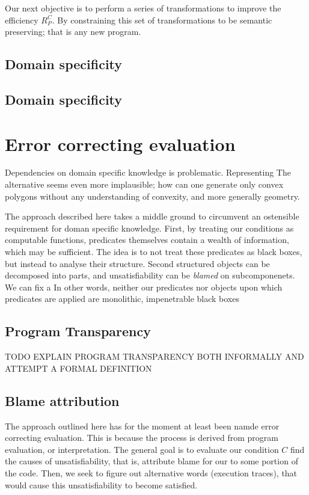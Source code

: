 Our next objective is to perform a series of transformations to improve the efficiency $R_P^C$.
By constraining this set of transformations to be semantic preserving; that is any new program.

\subsection{Domain specificity}

\subsection{Domain specificity}

\section{Error correcting evaluation}
Dependencies on domain specific knowledge is problematic.
Representing 
The alternative seems even more implausible; how can one generate only convex polygons without any understanding of  convexity, and more generally geometry.

The approach described here takes a middle ground to circumvent an ostensible requirement for doman specific knowledge.
First, by treating our conditions as computable functions, predicates themselves contain a wealth of information, which may be sufficient.
The idea is to not treat these predicates as black boxes, but instead to analyse their structure.
Second structured objects can be decomposed into parts, and unsatisfiability can be {\em blamed} on subcomponenets.
We can fix a 
In other words, neither our predicates nor objects upon which predicates are applied are monolithic, impenetrable black boxes

\subsection{Program Transparency}
TODO EXPLAIN PROGRAM TRANSPARENCY BOTH INFORMALLY AND ATTEMPT A FORMAL DEFINITION

\subsection{Blame attribution}
The approach outlined here has for the moment at least been namde error correcting evaluation.
This is because the process is derived from program evaluation, or interpretation.
The general goal is to evaluate our condition $C$ find the causes of unsatisfiability, that is, attribute blame for our to some portion of the code.
Then, we seek to figure out alternative words (execution traces), that would cause this unsatisfiability to become satisfied.

